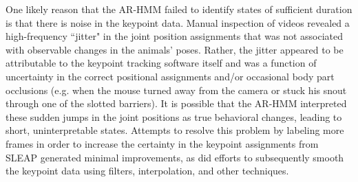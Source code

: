 One likely reason that the AR-HMM failed to identify states of sufficient duration is that there is noise in the keypoint data. Manual inspection of videos revealed a high-frequency ``jitter" in the joint position assignments that was not associated with observable changes in the animals' poses. Rather, the jitter appeared to be attributable to the keypoint tracking software itself and was a function of uncertainty in the correct positional assignments and/or occasional body part occlusions (e.g. when the mouse turned away from the camera or stuck his snout through one of the slotted barriers). It is possible that the AR-HMM interpreted these sudden jumps in the joint positions as true behavioral changes, leading to short, uninterpretable states. Attempts to resolve this problem by labeling more frames in order to increase the certainty in the keypoint assignments from SLEAP generated minimal improvements, as did efforts to subsequently smooth the keypoint data using filters, interpolation, and other techniques. 